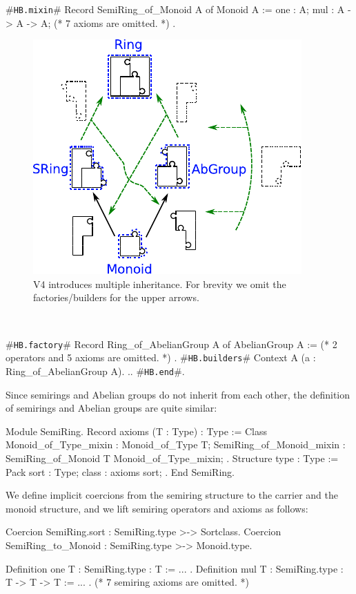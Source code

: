 \documentclass[a4paper,UKenglish,cleveref, autoref]{lipics-v2019}
\newcommand{\hbmixin}{{\tt\color{dkgreen}HB.mixin}}
\newcommand{\hbfactory}{{\tt\color{dkgreen}HB.factory}}
\newcommand{\hbbuilders}{{\tt\color{dkgreen}HB.builders}}
\newcommand{\hbend}{{\tt\color{dkgreen}HB.end}}
\theoremstyle{implem}
\theoremstyle{implem}
\theoremstyle{command}
\theoremstyle{commands}
\begin{document}
\begin{coqcode}
#\hbmixin{}# Record SemiRing_of_Monoid A of Monoid A := {
  one : A;
  mul : A -> A -> A;
  (* 7 axioms are omitted. *)
}.
\end{coqcode}

\begin{figure}
  \includegraphics[width=.4\textwidth]{v4.pdf}
  \caption{V4 introduces multiple inheritance. For brevity we omit the factories/builders for the upper arrows.}
  \label{fig:puzzle_v4}
\end{figure}
\
\begin{coqcode}
#\hbfactory{}# Record Ring_of_AbelianGroup A
  of AbelianGroup A := {
  (* 2 operators and 5 axioms are omitted. *)
}.
#\hbbuilders{}# Context A (a : Ring_of_AbelianGroup A).
..
#\hbend{}#.
\end{coqcode}


Since semirings and Abelian groups do not inherit from each other,
the definition of semirings and Abelian groups are quite similar:
\begin{coqcode}
Module SemiRing.
Record axioms (T : Type) : Type := Class {
  Monoid_of_Type_mixin :
    Monoid_of_Type T;
  SemiRing_of_Monoid_mixin :
    SemiRing_of_Monoid T Monoid_of_Type_mixin;
}.
Structure type : Type := Pack { sort : Type; class : axioms sort; }.
End SemiRing.
\end{coqcode}
We define implicit coercions from the semiring structure to the carrier
and the monoid structure, and we lift semiring operators and axioms as follows:
\begin{coqcode}
Coercion SemiRing.sort : SemiRing.type >-> Sortclass.
Coercion SemiRing_to_Monoid : SemiRing.type >-> Monoid.type.

Definition one {T : SemiRing.type} : T := ... .
Definition mul {T : SemiRing.type} : T -> T -> T := ... .
(* 7 semiring axioms are omitted. *)
\end{coqcode}
\end{document}

